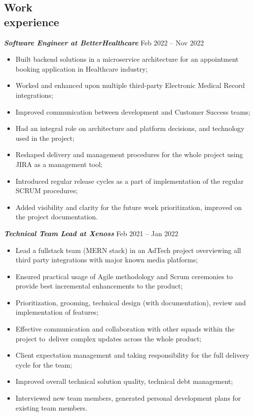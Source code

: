 \documentclass[margin, 10pt]{res} %
\begin{document}
\begin{resume}
\section{Work\\ experience}
{\sl \bf Software Engineer at BetterHealthcare } \hfill Feb 2022 -- Nov 2022
\vspace{3px}
\begin{itemize}
\item Built backend solutions in a microservice architecture for an appointment booking application in Healthcare industry;
\item Worked and enhanced upon multiple third-party Electronic Medical Record integrations;
\item Improved communication between development and Customer Success teams;
\item Had an integral role on architecture and platform decisions, and technology used in the project;
\item Reshaped delivery and management procedures for the whole project using JIRA as a management tool;
\item Introduced regular release cycles as a part of implementation of the regular SCRUM procedures;
\item Added visibility and clarity for the future work prioritization, improved on the project documentation.
\end{itemize}

{\sl \bf Technical Team Lead at Xenoss } \hfill Feb 2021 -- Jan 2022
\vspace{3px}
\begin{itemize}
 \item Lead a fullstack team (MERN stack) in an AdTech project overviewing all third party integrations with major known media platforms;
 \item Ensured practical usage of Agile methodology and Scrum ceremonies to provide best incremental enhancements to the product;
 \item Prioritization, grooming, technical design (with documentation), review and implementation of features;
 \item Effective communication and collaboration with other squads within the project to~deliver complex updates across the whole product;
 \item Client expectation management and taking responsibility for the full delivery cycle for the team;
 \item Improved overall technical solution quality, technical debt management;
 \item Interviewed new team members, generated personal development plans for existing team members.
\end{itemize}


\end{resume}
\end{document}
